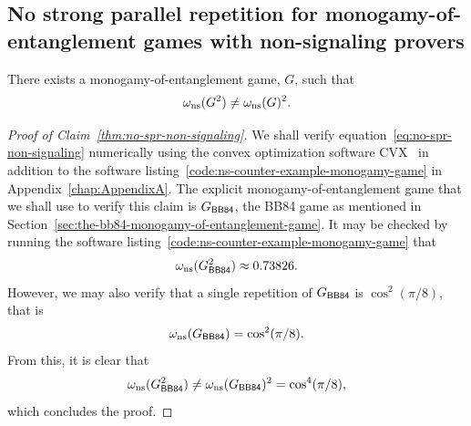 \subsection{No strong parallel repetition for monogamy-of-entanglement games with non-signaling provers} \label{sec:monog-non-signaling}

\begin{claim} \label{thm:no-spr-non-signaling}
	There exists a monogamy-of-entanglement game, $G$, such that
	\begin{align} \label{eq:no-spr-non-signaling}
		\omega_{\textnormal{ns}}(G^2) \not= \omega_{\textnormal{ns}}(G)^2.
	\end{align}		
\end{claim}

\begin{proof}[Proof of Claim~\ref{thm:no-spr-non-signaling}]
	We shall verify equation~\eqref{eq:no-spr-non-signaling} numerically using the convex optimization software CVX~\cite{Grant2008a} in addition to the software listing~\ref{code:ns-counter-example-monogamy-game} in Appendix~\ref{chap:AppendixA}. The explicit monogamy-of-entanglement game that we shall use to verify this claim is $G_{\BB84}$, the BB84 game as mentioned in Section~\ref{sec:the-bb84-monogamy-of-entanglement-game}. It may be checked by running the software listing~\ref{code:ns-counter-example-monogamy-game} that 
	\begin{align}
		\omega_{\ns}(G_{\BB84}^2) \approx 0.73826. 
	\end{align}
However, we may also verify that a single repetition of $G_{\BB84}$ is $\cos^2(\pi/8)$, that is
	\begin{align}
		\omega_{\ns}(G_{\BB84}) = \cos^2(\pi/8).
	\end{align}
From this, it is clear that 
\begin{align}
	\omega_{\ns}(G_{\BB84}^2) \not= \omega_{\ns}(G_{\BB84})^2 = \cos^4(\pi/8),
\end{align}
which concludes the proof. 
\end{proof}

